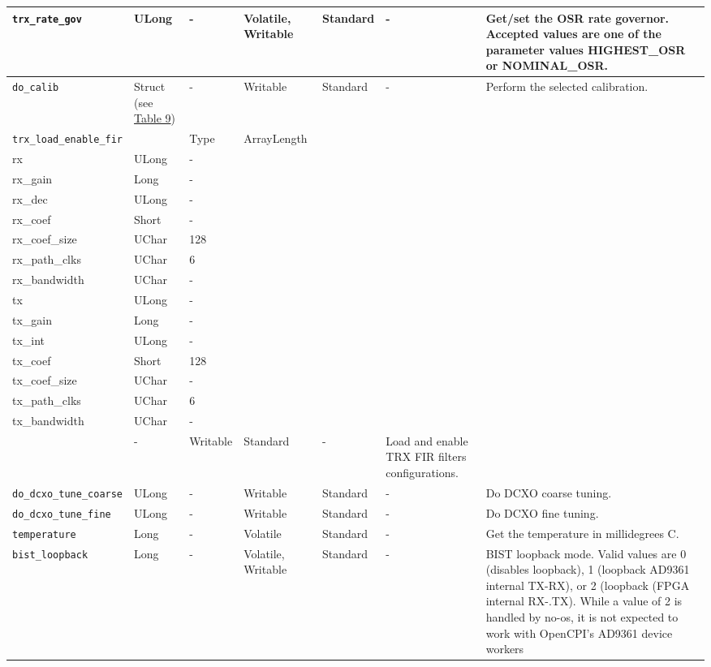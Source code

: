 \documentclass{article}
\begin{document}
\begin{landscape}
\begin{scriptsize}
\begin{longtable}{|p{3.6cm}|p{8.1cm}|p{1.4cm}|p{1.3cm}|p{1.4cm}|p{2.5cm}|p{3.6cm}|}
			\hline
			\verb+trx_rate_gov+ & ULong & - & Volatile, Writable & Standard & - & Get/set the OSR rate governor. Accepted values are one of the parameter values HIGHEST\_OSR or NOMINAL\_OSR. \\
			\hline
			\verb+do_calib+ & Struct (see \hyperlink{tab9}{Table 9})  & - & Writable & Standard & - & Perform the selected calibration. \\
			\hline
			\verb+trx_load_enable_fir+ & \begin{tabular}{|p{2.2cm}|p{2.7cm}|p{1.7cm}|} \hline \cellcolor{blue} Name & \cellcolor{blue}Type & \cellcolor{blue} ArrayLength \\ \hline rx & ULong & - \\ \hline rx\_gain & Long & - \\ \hline rx\_dec & ULong & - \\ \hline rx\_coef & Short & - \\ \hline rx\_coef\_size & UChar & 128 \\ \hline rx\_path\_clks & UChar & 6 \\ \hline rx\_bandwidth & UChar & - \\ \hline tx & ULong & - \\ \hline tx\_gain & Long & - \\ \hline tx\_int & ULong & - \\ \hline tx\_coef & Short & 128 \\ \hline tx\_coef\_size & UChar & - \\ \hline tx\_path\_clks & UChar & 6 \\ \hline tx\_bandwidth & UChar & - \\ \hline\end{tabular} & - & Writable & Standard & - & Load and enable TRX FIR filters configurations. \\
			\hline
			\verb+do_dcxo_tune_coarse+ & ULong & - & Writable & Standard & - & Do DCXO coarse tuning.\\
			\hline
			\verb+do_dcxo_tune_fine+ & ULong & - & Writable & Standard & - & Do DCXO fine tuning. \\
			\hline
			\verb+temperature+ & Long & - & Volatile & Standard & - & Get the temperature in millidegrees C. \\
			\hline
			\verb+bist_loopback+ & Long & - & Volatile, Writable & Standard & - & BIST loopback mode. Valid values are 0 (disables loopback), 1 (loopback AD9361 internal TX-RX), or 2 (loopback (FPGA internal RX-.TX). While a value of 2 is handled by no-os, it is not expected to work with OpenCPI's AD9361 device workers \\

\end{longtable}
\end{scriptsize}
\end{landscape}
\end{document}
